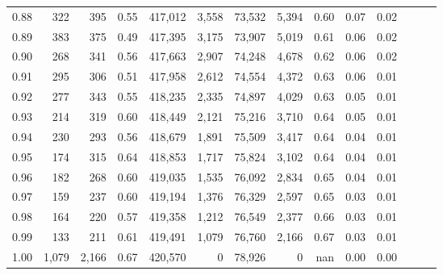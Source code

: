 \begin{tabular}{rrrrrrrrrrrrrr}
0.88 &     322 &    395 &  0.55 &  417,012 &    3,558 &  73,532 &   5,394 &  0.60 &  0.07 &      0.02 \\
0.89 &     383 &    375 &  0.49 &  417,395 &    3,175 &  73,907 &   5,019 &  0.61 &  0.06 &      0.02 \\
0.90 &     268 &    341 &  0.56 &  417,663 &    2,907 &  74,248 &   4,678 &  0.62 &  0.06 &      0.02 \\
0.91 &     295 &    306 &  0.51 &  417,958 &    2,612 &  74,554 &   4,372 &  0.63 &  0.06 &      0.01 \\
0.92 &     277 &    343 &  0.55 &  418,235 &    2,335 &  74,897 &   4,029 &  0.63 &  0.05 &      0.01 \\
0.93 &     214 &    319 &  0.60 &  418,449 &    2,121 &  75,216 &   3,710 &  0.64 &  0.05 &      0.01 \\
0.94 &     230 &    293 &  0.56 &  418,679 &    1,891 &  75,509 &   3,417 &  0.64 &  0.04 &      0.01 \\
0.95 &     174 &    315 &  0.64 &  418,853 &    1,717 &  75,824 &   3,102 &  0.64 &  0.04 &      0.01 \\
0.96 &     182 &    268 &  0.60 &  419,035 &    1,535 &  76,092 &   2,834 &  0.65 &  0.04 &      0.01 \\
0.97 &     159 &    237 &  0.60 &  419,194 &    1,376 &  76,329 &   2,597 &  0.65 &  0.03 &      0.01 \\
0.98 &     164 &    220 &  0.57 &  419,358 &    1,212 &  76,549 &   2,377 &  0.66 &  0.03 &      0.01 \\
0.99 &     133 &    211 &  0.61 &  419,491 &    1,079 &  76,760 &   2,166 &  0.67 &  0.03 &      0.01 \\
1.00 &   1,079 &  2,166 &  0.67 &  420,570 &        0 &  78,926 &       0 &   nan &  0.00 &      0.00 \\
\bottomrule
\end{tabular}
